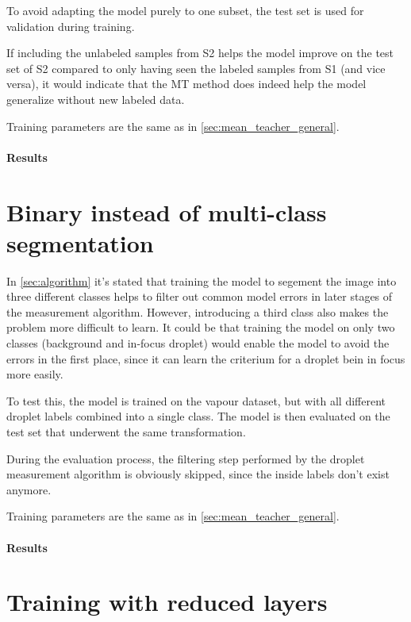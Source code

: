 To avoid adapting the model purely to one subset, the test set is used for validation during training. 

If including the unlabeled samples from S2 helps the model improve on the test set of S2 compared to only having seen the labeled samples from S1 (and vice versa), it would indicate that the MT method does indeed help the model generalize without new labeled data.

Training parameters are the same as in \ref{sec:mean_teacher_general}.

\paragraph{Results}


\section{Binary instead of multi-class segmentation}
\label{sec:binary}

In \ref{sec:algorithm} it's stated that training the model to segement the image into three different classes helps to filter out common model errors in later stages of the measurement algorithm. 
However, introducing a third class also makes the problem more difficult to learn. It could be that training the model on only two classes (background and in-focus droplet) would enable the model to avoid the errors in the first place, since it can learn the criterium for a droplet bein in focus more easily.

To test this, the model is trained on the vapour dataset, but with all different droplet labels combined into a single class. The model is then evaluated on the test set that underwent the same transformation. 

During the evaluation process, the filtering step performed by the droplet measurement algorithm is obviously skipped, since the inside labels don't exist anymore. 

Training parameters are the same as in \ref{sec:mean_teacher_general}.

\paragraph{Results}


\section{Training with reduced layers}
\label{sec:reduced_layers}

